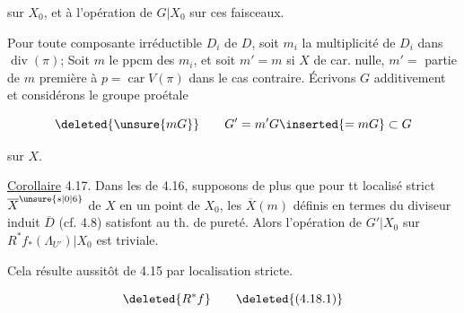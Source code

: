 
sur $X_0$, et à l'opération de $G|X_0$ sur ces faisceaux.

Pour toute composante irréductible $D_i$ de $D$, soit $m_i$ la multiplicité de  $D_i$ dans $\operatorname{div}(\pi)$; Soit $m$ le ppcm des $m_i$, et soit $m'=m$ si $X$ de car. nulle, $m'=$ partie de $m$ première à $p=\operatorname{car}V(\pi)$ dans le cas contraire. Écrivons $G$ additivement et considérons le groupe proétale

\[
\deleted{\unsure{mG}}\qquad G'=m'G\inserted{=mG}\subset G
\]

sur $X$. 

\uline{Corollaire} 4.17. Dans les  de 4.16, supposons de plus que pour tt localisé strict $\overline{X}^{\unsure{s|0|6}}$ de $X$ en un point de $X_0$, les $\overline{X}(m)$ définis en termes du diviseur induit $\overline{D}$ (cf. 4.8) satisfont au th. de pureté. Alors l'opération de $G'|X_0$ sur  $R^*f_*(\Lambda_{U'})|X_0$ est triviale.

Cela résulte aussitôt de 4.15 par localisation stricte.


\[
\deleted{R^*f}
\tag*{\deleted{(4.18.1)}}
\]
